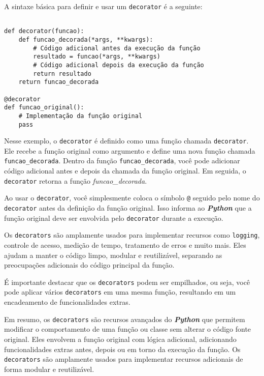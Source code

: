 \documentclass[a4paper, 12pt, onecolumn,singlespacing]{article}
\begin{document}
	A sintaxe básica para definir e usar um \texttt{decorator} é a seguinte:
	
\begin{verbatim}
	
def decorator(funcao):
	def funcao_decorada(*args, **kwargs):
		# Código adicional antes da execução da função
		resultado = funcao(*args, **kwargs)
		# Código adicional depois da execução da função
		return resultado
	return funcao_decorada

@decorator
def funcao_original():
	# Implementação da função original
	pass

\end{verbatim}

Nesse exemplo, o \texttt{decorator} é definido como uma função chamada \texttt{decorator}. Ele recebe a função original como argumento e define uma nova função chamada \texttt{funcao\_decorada}. Dentro da função \texttt{funcao\_decorada}, você pode adicionar código adicional antes e depois da chamada da função original. Em seguida, o \texttt{decorator} retorna a função \textit{funcao\_decorada}.

Ao usar o \texttt{decorator}, você simplesmente coloca o símbolo \texttt{@} seguido pelo nome do \texttt{decorator} antes da definição da função original. Isso informa ao \textbf{\textit{Python}} que a função original deve ser envolvida pelo \texttt{decorator} durante a execução.

Os \texttt{decorators} são amplamente usados para implementar recursos como \texttt{logging}, controle de acesso, medição de tempo, tratamento de erros e muito mais. Eles ajudam a manter o código limpo, modular e reutilizável, separando as preocupações adicionais do código principal da função.

É importante destacar que os \texttt{decorators} podem ser empilhados, ou seja, você pode aplicar vários \texttt{decorators} em uma mesma função, resultando em um encadeamento de funcionalidades extras.

Em resumo, os \texttt{decorators} são recursos avançados do \textit{\textbf{Python}} que permitem modificar o comportamento de uma função ou classe sem alterar o código fonte original. Eles envolvem a função original com lógica adicional, adicionando funcionalidades extras antes, depois ou em torno da execução da função. Os \texttt{decorators} são amplamente usados para implementar recursos adicionais de forma modular e reutilizável.
\end{document}
